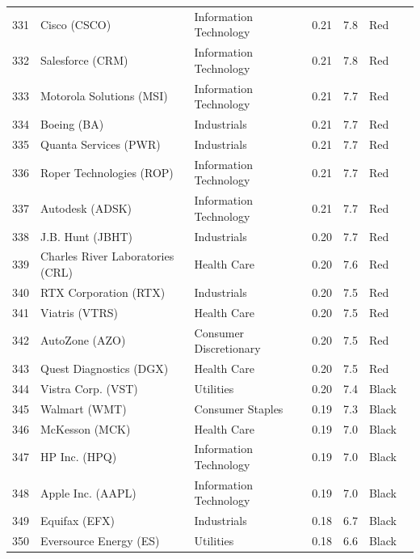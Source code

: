\documentclass[11pt,a4paper]{article}
\begin{document}
{\begin{longtable}{r p{4.4cm} p{2.8cm} r r l l}
331 & Cisco (CSCO) & Information Technology & 0.21 & 7.8 & \cellcolor[HTML]{F4B6B6}Red &  \\
332 & Salesforce (CRM) & Information Technology & 0.21 & 7.8 & \cellcolor[HTML]{F4B6B6}Red &  \\
333 & Motorola Solutions (MSI) & Information Technology & 0.21 & 7.7 & \cellcolor[HTML]{F4B6B6}Red &  \\
334 & Boeing (BA) & Industrials & 0.21 & 7.7 & \cellcolor[HTML]{F4B6B6}Red &  \\
335 & Quanta Services (PWR) & Industrials & 0.21 & 7.7 & \cellcolor[HTML]{F4B6B6}Red &  \\
336 & Roper Technologies (ROP) & Information Technology & 0.21 & 7.7 & \cellcolor[HTML]{F4B6B6}Red &  \\
337 & Autodesk (ADSK) & Information Technology & 0.21 & 7.7 & \cellcolor[HTML]{F4B6B6}Red &  \\
338 & J.B. Hunt (JBHT) & Industrials & 0.20 & 7.7 & \cellcolor[HTML]{F4B6B6}Red &  \\
339 & Charles River Laboratories (CRL) & Health Care & 0.20 & 7.6 & \cellcolor[HTML]{F4B6B6}Red &  \\
340 & RTX Corporation (RTX) & Industrials & 0.20 & 7.5 & \cellcolor[HTML]{F4B6B6}Red &  \\
341 & Viatris (VTRS) & Health Care & 0.20 & 7.5 & \cellcolor[HTML]{F4B6B6}Red &  \\
342 & AutoZone (AZO) & Consumer Discretionary & 0.20 & 7.5 & \cellcolor[HTML]{F4B6B6}Red &  \\
343 & Quest Diagnostics (DGX) & Health Care & 0.20 & 7.5 & \cellcolor[HTML]{F4B6B6}Red &  \\
344 & Vistra Corp. (VST) & Utilities & 0.20 & 7.4 & \cellcolor[HTML]{BFBFBF}Black &  \\
345 & Walmart (WMT) & Consumer Staples & 0.19 & 7.3 & \cellcolor[HTML]{BFBFBF}Black &  \\
346 & McKesson (MCK) & Health Care & 0.19 & 7.0 & \cellcolor[HTML]{BFBFBF}Black &  \\
347 & HP Inc. (HPQ) & Information Technology & 0.19 & 7.0 & \cellcolor[HTML]{BFBFBF}Black &  \\
348 & Apple Inc. (AAPL) & Information Technology & 0.19 & 7.0 & \cellcolor[HTML]{BFBFBF}Black &  \\
349 & Equifax (EFX) & Industrials & 0.18 & 6.7 & \cellcolor[HTML]{BFBFBF}Black &  \\
350 & Eversource Energy (ES) & Utilities & 0.18 & 6.6 & \cellcolor[HTML]{BFBFBF}Black &  \\

\end{longtable}}
\end{document}
